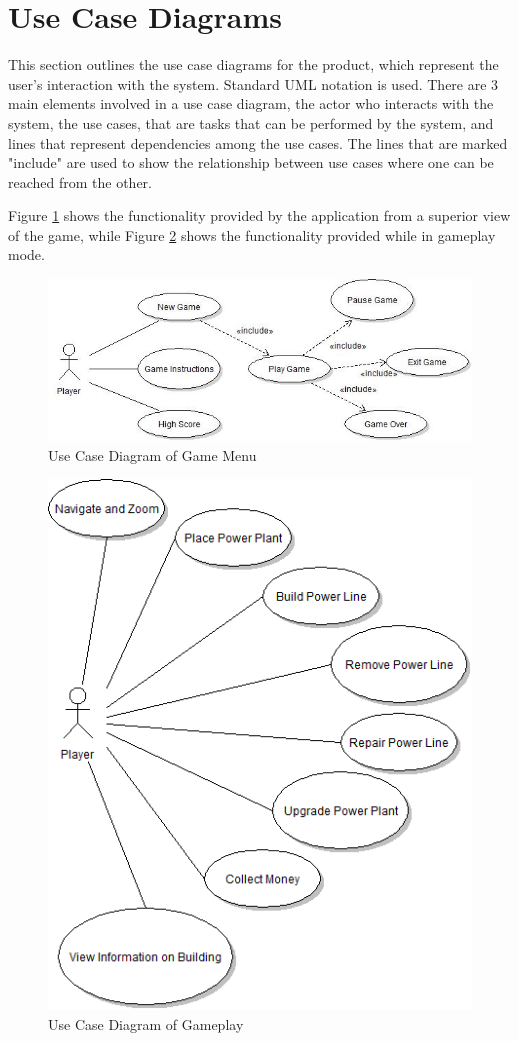 \section{Use Case Diagrams}
\label{sec:usecasediagrams}

This section outlines the use case diagrams for the product, which represent the user's interaction with 
the system. Standard UML notation is used. \cite{usecaseUML} There are 3 main elements involved in a use 
case diagram, the actor who interacts with the system, the use cases, that are tasks that can be performed 
by the system, and lines that represent dependencies among the use cases. The lines that are marked "include" 
are used to show the relationship between use cases where one can be reached from the other.

Figure \ref{fig:ucdmenu} shows the functionality provided by the application from a superior view of 
the game, while Figure \ref{fig:ucdgameplay} shows the functionality provided while in gameplay mode.

\begin{figure}[H]
  	\centering
	\includegraphics[width=\textwidth]{pictures/UCD_Game_Menu.jpg}
	\caption{Use Case Diagram of Game Menu}
	\label{fig:ucdmenu}
\end{figure}

\begin{figure}[H]
  	\centering
	\includegraphics[width=\textwidth]{pictures/UCD_PlayGame.png}
	\caption{Use Case Diagram of Gameplay}
	\label{fig:ucdgameplay}
\end{figure}

